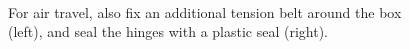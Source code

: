 \begin{figure}[h!]
\centering
\mbox{\quad
{}}
\caption{For air travel, also fix an additional tension belt around the box (left), and seal the hinges with a plastic seal (right).} %
\end{figure}

